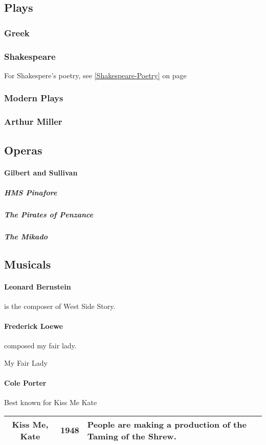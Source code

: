		\subsection{Plays}
			\subsubsection{Greek}
			\subsubsection{Shakespeare} \label{Shakespeare-Play} For Shakespere's poetry, see \ref{Shakespeare-Poetry} on page 
			\subsubsection{Modern Plays}
			\subsubsection{Arthur Miller}
			
			
		\subsection{Operas}
		
		
		
		\paragraph{Gilbert and Sullivan}
			\subparagraph{HMS Pinafore}
			\subparagraph{The Pirates of Penzance}
			\subparagraph{The Mikado}
\newpage
		\subsection{Musicals}
		\paragraph{Leonard Bernstein} is the composer of West Side Story.  
		



		\paragraph {Frederick Loewe} composed my fair lady.
		
		My Fair Lady

		\paragraph{Cole Porter}
		Best known for Kiss Me Kate
			\begin{longtable}{|c|c|p{3in}|}
	
	
				\hline
				Kiss Me, Kate & 1948 & People are making a production of the Taming of the Shrew.  \\
				\hline
	
	
	
	
\end{longtable}
